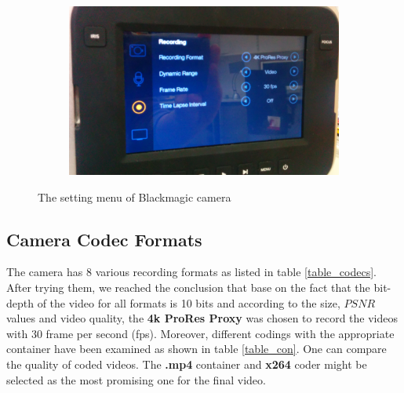 \documentclass[[12pt,DIV14,BCOR12mm,a4paper,footexclude,headinclude,halfparskip-,twoside,openright,cleardoubleempty,idxtotoc,bibtotoc]{article}
\begin{document}
\begin{figure}[ht]
\begin{subfigure}[b]{0.22\textwidth}
	      \caption{}
		\label{fig_cam_d}
	\end{subfigure}
	\begin{subfigure}[b]{0.22\textwidth}
	      \includegraphics[width=\textwidth]{figures/camera5.png}
	      \caption{}
		\label{fig_cam_e}
	\end{subfigure}
	\caption{The setting menu of Blackmagic camera}
	\label{fig_cam}
\end{figure}


\subsection{ Camera Codec Formats}

The camera has 8 various recording formats as listed in table \ref{table_codecs}. After trying them, we reached the conclusion that base on the fact that the bit-depth of the video for all formats is 10 bits and according to the size, $PSNR$ values and video quality,  the \textbf{4k ProRes Proxy} was chosen to record the videos with 30 frame per second (fps). Moreover, different codings with the appropriate container have been examined as shown in table \ref{table_con}. One can compare the quality of coded videos. The \textbf{.mp4} container and \textbf{x264} coder might be selected as the most promising one for the final video.
\end{document}
